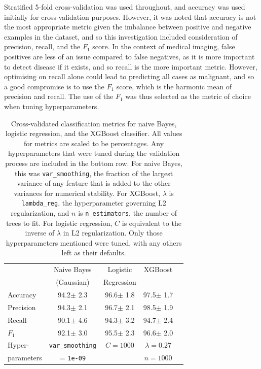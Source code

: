 \documentclass{article}
\begin{document}
	Stratified 5-fold cross-validation was used throughout, and accuracy was used initially for cross-validation purposes. However, it was noted that accuracy is not the most appropriate metric given the imbalance between positive and negative examples in the dataset, and so this investigation included consideration of precision, recall, and the $F_{1}$ score. In the context of medical imaging, false positives are less of an issue compared to false negatives, as it is more important to detect disease if it exists, and so recall is the more important metric. However, optimising on recall alone could lead to predicting all cases as malignant, and so a good compromise is to use the $F_1$ score, which is the harmonic mean of precision and recall. The use of the $F_1$ was thus selected as the metric of choice when tuning hyperparameters.
	
	\begin{table}[t]
		\caption{Cross-validated classification metrics for naive Bayes, logistic regression, and the XGBoost classifier. All values for metrics are scaled to be percentages. Any hyperparameters that were tuned during the validation process are included in the bottom row. For naive Bayes, this was \texttt{var\_smoothing}, the fraction of the largest variance of any feature that is added to the other variances for numerical stability. For XGBoost, $\lambda$ is \texttt{lambda\_reg}, the hyperparameter governing L2 regularization, and $n$ is \texttt{n\_estimators}, the number of trees to fit. For logistic regression, $C$ is equivalent to the inverse of $\lambda$ in L2 regularization. Only those hyperparameters mentioned were tuned, with any others left as their defaults.}
		\label{ML-table}
		\vskip 0.15in
		\begin{center}
			\begin{small}
				\begin{sc}
					\begin{tabular}{lcccr}
						\toprule
						 & Naive Bayes & Logistic & XGBoost \\
						&(Gaussian)&Regression\\
						\midrule
						Accuracy    & 94.2$\pm$ 2.3& 96.6$\pm$ 1.8& 97.5$\pm$ 1.7\\
						Precision 	& 94.3$\pm$ 2.1& 96.7$\pm$ 2.1& 98.5$\pm$ 1.9\\
						Recall    	& 90.1$\pm$ 4.6& 94.3$\pm$ 3.2& 94.7$\pm$ 2.4\\
						$F_{1}$    	& 92.1$\pm$ 3.0& 95.5$\pm$ 2.3& 96.6$\pm$ 2.0\\
						Hyper-     	& \tiny\texttt{var\_smoothing} & $C = 1000$& $\lambda = 0.27$\\
						parameters  & \small= \texttt{1e-09}&&$n=1000$\\
						\bottomrule
					\end{tabular}
				\end{sc}
			\end{small}
		\end{center}
		\vskip -0.1in
	\end{table}
	
\end{document}
